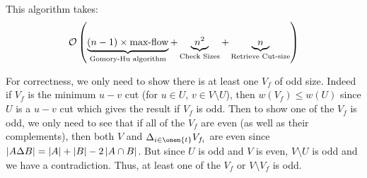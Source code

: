 \documentclass[math, info]{cours}
\begin{document}
This algorithm takes:
\begin{equation*}
	\mathcal{O}\left( \underbrace{(n-1)\times \text{max-flow}}_{\text{Gomory-Hu algorithm}} + \underbrace{n^{2}}_{\text{Check Sizes}} + \underbrace{n}_{\text{Retrieve Cut-size}} \right)
\end{equation*}

For correctness, we only need to show there is at least one $V_f$ of odd size. 
Indeed if $V_{f}$ is the minimum $u-v$ cut (for $u \in U$, $v \in V \setminus U$), then $w(V_{f}) \leq w(U)$ since $U$ is a $u-v$ cut which gives the result if $V_{f}$ is odd. 
Then to show one of the $V_{f}$ is odd, we only need to see that if all of the $V_{f}$ are even (as well as their complements), then both $V$ and $\Delta_{i \in \onen{t}} V_{f_{i}}$ are even since $\left|A \Delta B\right| = \left|A\right| + \left|B\right| - 2\left|A \cap B\right|$.
But since $U$ is odd and $V$ is even, $V \setminus U$ is odd and we have a contradiction.
Thus, at least one of the $V_{f}$ or $V \setminus V_{f}$ is odd.  
\end{document}
